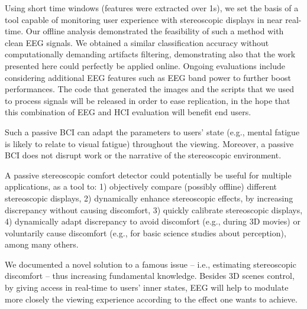 \documentclass{template/llncs}
\begin{document}
Using short time windows (features were extracted over 1s), we set the basis of a tool capable of monitoring user experience with stereoscopic displays in near real-time.
Our offline analysis
demonstrated the feasibility of such a method with clean EEG signals. We obtained a similar classification accuracy without computationally demanding artifacts filtering, demonstrating also that the work presented here could perfectly be applied online. Ongoing evaluations include considering additional EEG features such as EEG band power to further boost performances.
The code that generated the images and the scripts that we used to process signals will be released in order to ease replication, in the hope that this combination of EEG and HCI evaluation will benefit end users.




Such a passive BCI can adapt the parameters to users' state (e.g., mental fatigue is likely to relate to visual fatigue) throughout the viewing. Moreover, a passive BCI does not disrupt work or the narrative of the stereoscopic environment.








A passive stereoscopic comfort detector could potentially be useful for multiple applications, as a tool to: 1) objectively compare (possibly offline) different stereoscopic displays, 2) dynamically enhance stereoscopic effects, by increasing discrepancy without causing discomfort, 3) quickly calibrate stereoscopic displays, 4) dynamically adapt discrepancy to avoid discomfort (e.g., during 3D movies) or voluntarily cause discomfort (e.g., for basic science studies about perception), among many others. 

We documented a novel solution to a famous issue -- i.e., estimating stereoscopic discomfort -- thus increasing fundamental knowledge. Besides 3D scenes control, by giving access in real-time to users' inner states, EEG will help to modulate more closely the viewing experience according to the effect one wants to achieve.



\end{document}
